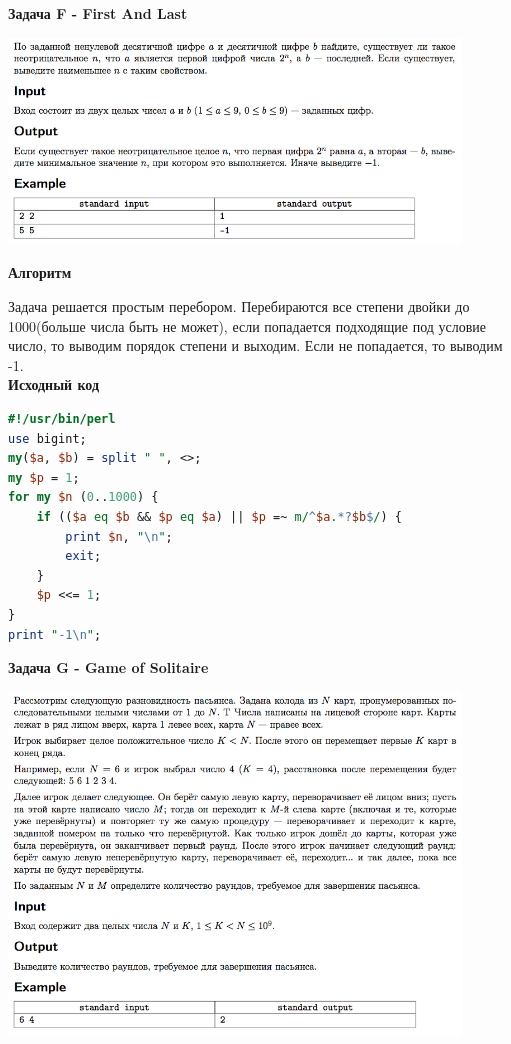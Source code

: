 \documentclass[a4paper,12pt]{article}
\begin{document}
\newpage
\textbf{{\large Задача F - First And Last}}

\begin{center}
\includegraphics[width=0.9\textwidth]{OC_Ukraine/F.png}\\ [1cm]
\end{center}

\textbf{{\large Алгоритм}}

Задача решается простым перебором. Перебираются все степени двойки до 1000(больше числа быть не может), если попадается подходящие под условие число, то выводим порядок степени и выходим. Если не попадается, то выводим -1. \\


\textbf{{\large Исходный код}} \\
\begin{lstlisting}[language=Perl]
#!/usr/bin/perl
use bigint;
my($a, $b) = split " ", <>;
my $p = 1;
for my $n (0..1000) {
	if (($a eq $b && $p eq $a) || $p =~ m/^$a.*?$b$/) {
		print $n, "\n";
		exit;
	}
	$p <<= 1;
}
print "-1\n";
\end{lstlisting}


\newpage
\textbf{{\large Задача G - Game of Solitaire}}

\begin{center}
\includegraphics[width=0.9\textwidth]{OC_Ukraine/G.png}\\ [1cm]
\end{center}
\end{document}
